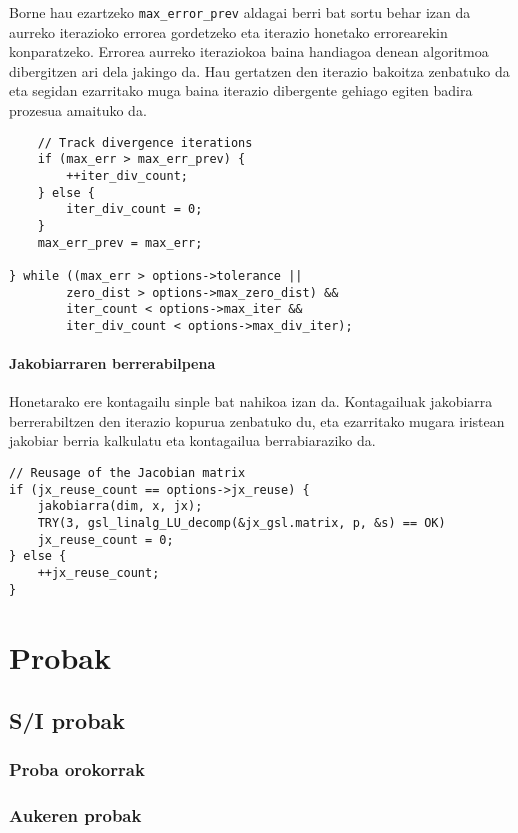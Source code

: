 \documentclass[10pt,a4paper,basque]{article}
\begin{document}
Borne hau ezartzeko \verb|max_error_prev| aldagai berri bat sortu behar izan da aurreko iterazioko errorea gordetzeko eta iterazio honetako errorearekin konparatzeko. Errorea aurreko iteraziokoa baina handiagoa denean algoritmoa dibergitzen ari dela jakingo da. Hau gertatzen den iterazio bakoitza zenbatuko da eta segidan ezarritako muga baina iterazio dibergente gehiago egiten badira prozesua amaituko da.

\begin{lstlisting}
	// Track divergence iterations
	if (max_err > max_err_prev) {
		++iter_div_count;
	} else {
		iter_div_count = 0;
	}
	max_err_prev = max_err;

} while ((max_err > options->tolerance ||
		zero_dist > options->max_zero_dist) &&
		iter_count < options->max_iter &&
		iter_div_count < options->max_div_iter);
\end{lstlisting}

\paragraph{Jakobiarraren berrerabilpena}

Honetarako ere kontagailu sinple bat nahikoa izan da. Kontagailuak jakobiarra berrerabiltzen den iterazio kopurua zenbatuko du, eta ezarritako mugara iristean jakobiar berria kalkulatu eta kontagailua berrabiaraziko da.

\begin{lstlisting}
// Reusage of the Jacobian matrix
if (jx_reuse_count == options->jx_reuse) {
	jakobiarra(dim, x, jx);
	TRY(3, gsl_linalg_LU_decomp(&jx_gsl.matrix, p, &s) == OK)
	jx_reuse_count = 0;
} else {
	++jx_reuse_count;
}
\end{lstlisting}

\section{Probak}

\subsection{S/I probak}

\subsubsection{Proba orokorrak}

\subsubsection{Aukeren probak}
\end{document}
